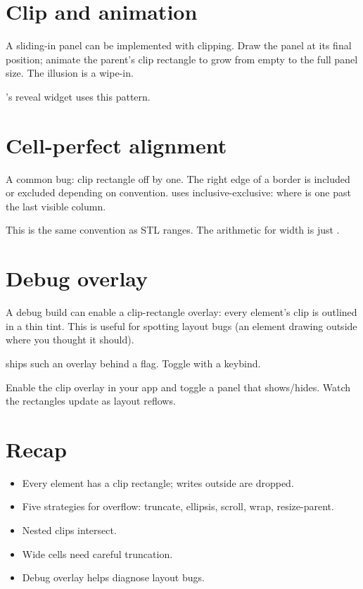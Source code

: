 \section{Clip and animation}

A sliding-in panel can be implemented with clipping. Draw the
panel at its final position; animate the parent's clip
rectangle to grow from empty to the full panel size. The
illusion is a wipe-in.

\maya{}'s reveal widget uses this pattern.

\section{Cell-perfect alignment}

A common bug: clip rectangle off by one. The right edge of a
border is included or excluded depending on convention. \maya{}
uses inclusive-exclusive:  where
 is one past the last visible column.

This is the same convention as STL ranges. The arithmetic for
width is just .

\section{Debug overlay}

A debug build can enable a clip-rectangle overlay: every
element's clip is outlined in a thin tint. This is useful for
spotting layout bugs (an element drawing outside where you
thought it should).

\maya{} ships such an overlay behind a flag. Toggle with a
keybind.

\begin{tryit}
Enable the clip overlay in your app and toggle a panel that
shows/hides. Watch the rectangles update as layout reflows.
\end{tryit}

\section{Recap}

\begin{recap}
\begin{itemize}[leftmargin=*]
  \item Every element has a clip rectangle; writes outside
    are dropped.
  \item Five strategies for overflow: truncate, ellipsis,
    scroll, wrap, resize-parent.
  \item Nested clips intersect.
  \item Wide cells need careful truncation.
  \item Debug overlay helps diagnose layout bugs.
\end{itemize}
\end{recap}

